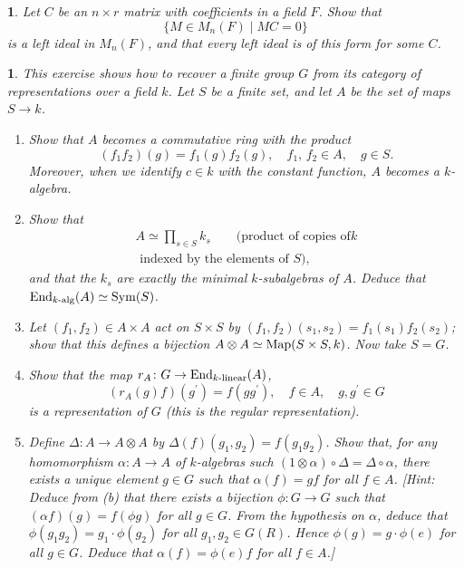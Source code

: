 \documentclass[a4paper,11pt,final]{memoir}%
\newtheorem{exercise}[Y]{}
\theoremstyle{nonumberplain}
\begin{document}
\begin{exercise}
\label{x40}Let $C$ be an $n\times r$ matrix with coefficients in a field $F$.
Show that%
\[
\{M\in M_{n}(F)\mid MC=0\}
\]
is a left ideal in $M_{n}(F)$, and that every left ideal is of this form for
some $C$.
\end{exercise}

\begin{exercise}
\label{x41}This exercise shows how to recover a finite group $G$ from its
category of representations over a field $k$. Let $S$ be a finite set, and let
$A$ be the set of maps $S\rightarrow k$.

\begin{enumerate}
\item Show that $A$ becomes a commutative ring with the product%
\[
(f_{1}f_{2})(g)=f_{1}(g)f_{2}(g),\quad f_{1}\text{, }f_{2}\in A,\quad g\in S.
\]
Moreover, when we identify $c\in k$ with the constant function, $A$ becomes a
$k$-algebra.

\item Show that
\begin{align*}
A\simeq\prod\nolimits_{s\in S}k_{s}\quad\quad\text{(product of copies of
}k\\
\text{ indexed by the elements of }S\text{)},
\end{align*}
and that the $k_{s}$ are exactly the minimal $k$-subalgebras of $A$. Deduce
that $\operatorname{End}_{k\text{-alg}}(A)\simeq\operatorname{Sym}(S)$.

\item Let $(f_{1},f_{2})\in A\times A$ act on $S\times S$ by $(f_{1}%
,f_{2})(s_{1},s_{2})=f_{1}(s_{1})f_{2}(s_{2})$; show that this defines a
bijection $A\otimes A\simeq\operatorname{Map}(S\times S,k)$. Now take $S=G$.

\item Show that the map $r_{A}\colon G\rightarrow\operatorname{End}_{k\text{-linear}}(A)$,
\[
(r_{A}(g)f)(g^{\prime})=f(gg^{\prime}),\quad f\in A,\quad g,g^{\prime}\in G
\]
is a representation of $G$ (this is the regular representation).

\item Define $\Delta\colon A\rightarrow A\otimes A$ by $\Delta(f)(g_{1}%
,g_{2})=f(g_{1}g_{2})$. Show that, for any homomorphism $\alpha\colon
A\rightarrow A$ of $k$-algebras such $(1\otimes\alpha)\circ\Delta=\Delta
\circ\alpha$, there exists a unique element $g\in G$ such that $\alpha(f)=gf$
for all $f\in A$. [Hint: Deduce from (b) that there exists a bijection
$\phi\colon G\rightarrow G$ such that $\left(  \alpha f\right)  (g)=f(\phi g)$
for all $g\in G$. From the hypothesis on $\alpha$, deduce that $\phi
(g_{1}g_{2})=g_{1}\cdot\phi(g_{2})$ for all $g_{1},g_{2}\in G(R)$. Hence
$\phi(g)=g\cdot\phi(e)$ for all $g\in G$. Deduce that $\alpha(f)=\phi(e)f$ for
all $f\in A$.]


\end{enumerate}
\end{exercise}
\end{document}
